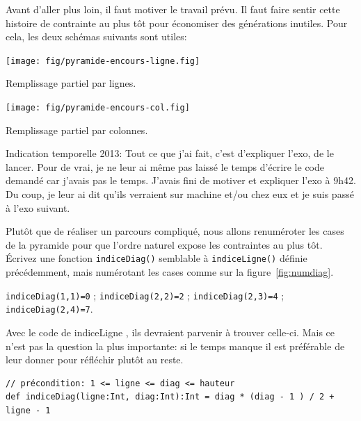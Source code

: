 \documentclass[10pt]{article}\usepackage[correction,nu]{esial}
\begin{document}
\begin{Reponse}
  Avant d'aller plus loin, il faut motiver le travail prévu. Il faut faire
  sentir cette histoire de contrainte au plus tôt pour économiser des
  générations inutiles. Pour cela, les deux schémas suivants sont utiles:
  
  \begin{minipage}{.4\linewidth}
    \centering
    \texttt{[image: fig/pyramide-encours-ligne.fig]}\vspace{-.5\baselineskip}
    
    Remplissage partiel par lignes.
  \end{minipage}\hfill
  \begin{minipage}{.4\linewidth} 
    \centering
    \texttt{[image: fig/pyramide-encours-col.fig]}\vspace{-.5\baselineskip}
    
    Remplissage partiel par colonnes.
  \end{minipage}

  Indication temporelle 2013: Tout ce que j'ai fait, c'est d'expliquer l'exo, de
  le lancer. Pour de vrai, je ne leur ai même pas laissé le temps d'écrire le
  code demandé car j'avais pas le temps. J'avais fini de motiver et expliquer
  l'exo à 9h42. Du coup, je leur ai dit qu'ils verraient sur machine et/ou chez
  eux et je suis passé à l'exo suivant.
\end{Reponse}

\Question %
Plutôt que de réaliser un parcours compliqué, nous allons renuméroter les cases
de la pyramide pour que l'ordre naturel expose les contraintes au plus
tôt. Écrivez une fonction \texttt{indiceDiag()} semblable à
\texttt{indiceLigne()} définie précédemment, mais numérotant les cases comme sur
la figure~\ref{fig:numdiag}.
 
\noindent\texttt{indiceDiag(1,1)=0} ; \hfill\texttt{indiceDiag(2,2)=2} ;
\hfill\texttt{indiceDiag(2,3)=4} ; \hfill\texttt{indiceDiag(2,4)=7}.
\begin{Reponse}
  Avec le code de indiceLigne , ils devraient parvenir à trouver celle-ci. Mais
  ce n'est pas la question la plus importante: si le temps manque il est
  préférable de leur donner pour réfléchir plutôt au reste.
  \begin{Verbatim}
// précondition: 1 <= ligne <= diag <= hauteur 
def indiceDiag(ligne:Int, diag:Int):Int = diag * (diag - 1 ) / 2 + ligne - 1
  \end{Verbatim}
\end{Reponse}
\end{document}
